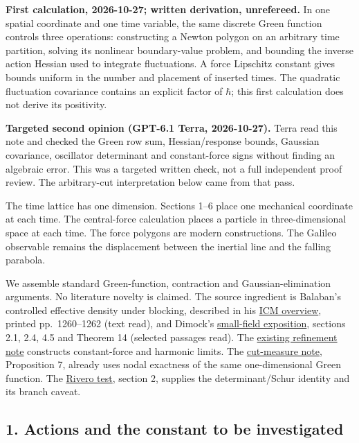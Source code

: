 \documentclass[11pt,a4paper]{article}
\begin{document}
\textbf{First calculation, 2026-10-27; written derivation, unrefereed.}
In one spatial coordinate and one time variable, the same discrete Green
function controls three operations: constructing a Newton polygon on an
arbitrary time partition, solving its nonlinear boundary-value problem,
and bounding the inverse action Hessian used to integrate fluctuations.
A force Lipschitz constant gives bounds uniform in the number and
placement of inserted times. The quadratic fluctuation covariance
contains an explicit factor of \(\hbar\); this first calculation does
not derive its positivity.

\textbf{Targeted second opinion (GPT-6.1 Terra, 2026-10-27).} Terra read
this note and checked the Green row sum, Hessian/response bounds,
Gaussian covariance, oscillator determinant and constant-force signs
without finding an algebraic error. This was a targeted written check,
not a full independent proof review. The arbitrary-cut interpretation
below came from that pass.

The time lattice has one dimension. Sections 1--6 place one mechanical
coordinate at each time. The central-force calculation places a particle
in three-dimensional space at each time. The force polygons are modern
constructions. The Galileo observable remains the displacement between
the inertial line and the falling parabola.

We assemble standard Green-function, contraction and
Gaussian-elimination arguments. No literature novelty is claimed. The
source ingredient is Balaban's controlled effective density under
blocking, described in his
\href{../docs/balaban/Balaban_UltravioletStability_ICM1986_1987.md}{ICM
overview}, printed pp.~1260--1262 (text read), and Dimock's
\href{../docs/balaban/Dimock_BalabanI_1108.1335v2.md}{small-field
exposition}, sections 2.1, 2.4, 4.5 and Theorem 14 (selected passages
read). The \href{refinement-composition-and-limit.md}{existing
refinement note} constructs constant-force and harmonic limits. The
\href{cut-measure-newton.md}{cut-measure note}, Proposition 7, already
uses nodal exactness of the same one-dimensional Green function. The
\href{rivero-1998-conjecture-central-forces.md}{Rivero test}, section 2,
supplies the determinant/Schur identity and its branch caveat.

\subsection{1. Actions and the constant to be
investigated}\label{actions-and-the-constant-to-be-investigated}
\end{document}
